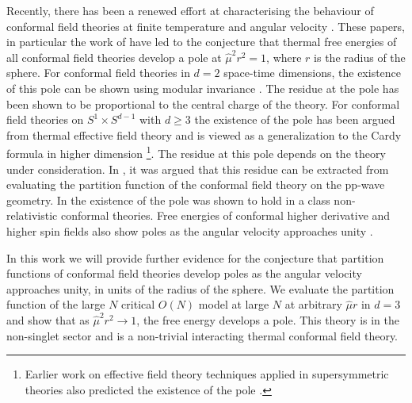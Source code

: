 \documentclass[a4paper,11pt]{article}
\begin{document}
	Recently, there has been a renewed effort at characterising  the behaviour of conformal field theories at finite temperature and 
	angular velocity  \cite{Shaghoulian:2016gol,Benjamin:2023qsc,Allameh:2024qqp,Anand:2025mfh}.
	These papers, in particular the work of  \cite{Anand:2025mfh} have led to the conjecture 
	that  thermal free energies of all conformal field theories develop a pole at  $\hat \mu^2r^2=1$, where $r$ is the radius of the sphere. 
	For conformal field theories   in $d=2$ space-time dimensions, the existence of this pole can be shown using modular invariance \cite{Shaghoulian:2015lcn,Benjamin:2023qsc,Anand:2025mfh}.  The residue at the pole has been shown to be proportional to the central charge of the theory. 
	For conformal field theories on $S^1\times S^{d-1}$ with $d\geq 3$  
	the existence of the pole  has been argued from thermal effective field theory \cite{Anand:2025mfh}  and is viewed
	as a generalization to the Cardy formula in higher dimension 
	\footnote{Earlier work on effective  field theory  techniques applied in supersymmetric theories  also predicted the existence of the 
		pole \cite{DiPietro:2014bca,Cassani:2021fyv}.}.
	The  residue 
	at this  pole depends on the theory under consideration. 
	In \cite{Komargodski:2026ain}, it was argued that this residue can be extracted from evaluating  the partition function of the 
	conformal field theory on the pp-wave geometry.  In  \cite{Lee:2026azy}  the existence of the pole was shown to hold in a class 
	non-relativistic conformal theories.   Free energies of 
	conformal higher derivative and higher spin fields also show poles as the angular velocity approaches unity  \cite{Mukherjee:2026dfu}. 
	
	In this work we will provide further evidence for the conjecture that partition functions of conformal field theories develop
	poles as the angular velocity approaches unity, in units of the radius of the sphere. 
	We evaluate the partition function of the large $N$ critical $O(N)$ model at large $N$ at arbitrary $\hat \mu r$  in $d =3$ and
	show that 
	as $\hat\mu^2 r^2  \rightarrow 1$, the free energy develops a pole. 
	This theory is  in the non-singlet sector and is a  non-trivial interacting thermal  conformal field theory. 
	
\end{document}
